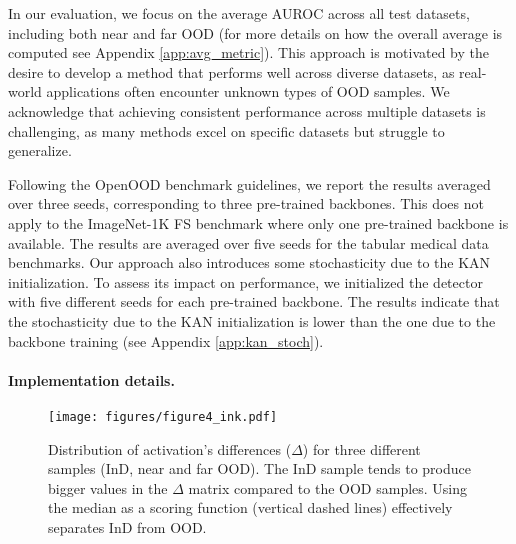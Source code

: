 In our evaluation, we focus on the average AUROC across all test datasets, including both near and far OOD (for more details on how the overall average is computed see Appendix \ref{app:avg_metric}). 
This approach is motivated by the desire to develop a method that performs well across diverse datasets, as real-world applications often encounter unknown types of OOD samples. 
We acknowledge that achieving consistent performance across multiple datasets is challenging, as many methods excel on specific datasets but struggle to generalize.

Following the OpenOOD benchmark guidelines, we report the results averaged over three seeds, corresponding to three pre-trained backbones. 
This does not apply to the ImageNet-1K FS benchmark where only one pre-trained backbone is available.
The results are averaged over five seeds for the tabular medical data benchmarks.
Our approach also introduces some stochasticity due to the KAN initialization. 
To assess its impact on performance, we initialized the detector with five different seeds for each pre-trained backbone. The results indicate that the stochasticity due to the KAN initialization is lower than the one due to the backbone training (see Appendix \ref{app:kan_stoch}).

\paragraph{Implementation details.} 
\label{sec:imp_details}

\begin{wrapfigure}{r}{0.4\textwidth}
    \vspace{-10pt} %
    \begin{center}
        \texttt{[image: figures/figure4\_ink.pdf]}
    \end{center}
    \caption{Distribution of activation's differences ($\Delta$) for three different samples (InD, near and far OOD). The InD sample tends to produce bigger values in the $\Delta$ matrix compared to the OOD samples. Using the median as a scoring function (vertical dashed lines) effectively separates InD from OOD.}
    \label{fig:delta_median}
    \vspace{-20pt} %
\end{wrapfigure}


